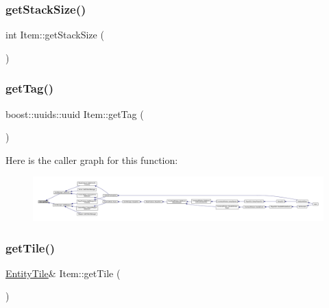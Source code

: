\subsubsection{\texorpdfstring{get\+Stack\+Size()}{getStackSize()}}
{\footnotesize\ttfamily int Item\+::get\+Stack\+Size (\begin{DoxyParamCaption}{ }\end{DoxyParamCaption})}

\mbox{\label{class_item_a5e829376b05757d63d2593fb378d05ff}} 
\subsubsection{\texorpdfstring{get\+Tag()}{getTag()}}
{\footnotesize\ttfamily boost\+::uuids\+::uuid Item\+::get\+Tag (\begin{DoxyParamCaption}{ }\end{DoxyParamCaption})}

Here is the caller graph for this function\+:
\nopagebreak
\begin{figure}[H]
\begin{center}
\leavevmode
\includegraphics[width=350pt]{dc/d32/class_item_a5e829376b05757d63d2593fb378d05ff_icgraph}
\end{center}
\end{figure}
\mbox{\label{class_item_a61272a187be1a07a49685cbee45d30bd}} 
\subsubsection{\texorpdfstring{get\+Tile()}{getTile()}}
{\footnotesize\ttfamily \mbox{\hyperlink{class_entity_tile}{Entity\+Tile}}\& Item\+::get\+Tile (\begin{DoxyParamCaption}{ }\end{DoxyParamCaption})}

\mbox{\label{class_item_a10dd503844c230e3d3bf890e969af867}} 
